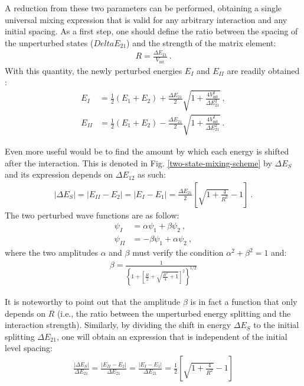 A reduction from these two parameters can be performed, obtaining a single universal mixing expression that is valid for any arbitrary interaction and any initial spacing. As a first step, one should define the ratio between the spacing of the unperturbed states ($Delta E_{21}$) and the strength of the matrix element:
\begin{align}
    R=\frac{\Delta E_{21}}{V_\text{int}}\ .
\end{align}
With this quantity, the newly perturbed energies $E_I$ and $E_{II}$ are readily obtained \cite{casten2000nuclear}:
\begin{align}
    E_I&=\frac{1}{2}(E_1+E_2)+\frac{\Delta E_{21}}{2}\sqrt{1+\frac{4V_\text{int}^2}{\Delta E_{21}^2}}\ ,\\
    E_{II}&=\frac{1}{2}(E_1+E_2)-\frac{\Delta E_{21}}{2}\sqrt{1+\frac{4V_\text{int}^2}{\Delta E_{21}^2}}\ .
    \label{eq-two-state-mixing-energies}
\end{align}

Even more useful would be to find the amount by which each energy is shifted after the interaction. This is denoted in Fig. \ref{two-state-mixing-scheme} by $\Delta E_S$ and its expression depends on $\Delta E_{12}$ as such:
\begin{align}
    |\Delta E_S|=|E_{II}-E_2|=|E_{I}-E_1|=\frac{\Delta E_{21}}{2}\left[\sqrt{1+\frac{4}{R^2}}-1\right]\ .
    \label{eq-shift-mixed-states}
\end{align}
The two perturbed wave functions are as follow:
\begin{align}
    \psi_I&=\alpha\psi_1+\beta\psi_2\ ,\nonumber\\
    \psi_{II}&=-\beta\psi_1+\alpha\psi_2\ ,
\end{align}
where the two amplitudes $\alpha$ and $\beta$ must verify the condition $\alpha^2+\beta^2=1$ and:
\begin{align}
    \beta=\frac{1}{\left\{1+\left[\frac{R}{2}+\sqrt{\frac{R^2}{4}+1}\right]^2\right\}^{1/2}}
    \label{eq-beta-mixing-amplitude}
\end{align}

It is noteworthy to point out that the amplitude $\beta$ is in fact a function that only depends on $R$ (i.e., the ratio between the unperturbed energy splitting and the interaction strength). Similarly, by dividing the shift in energy $\Delta E_S$ to the initial splitting $\Delta E_{21}$, one will obtain an expression that is independent of the initial level spacing:
\begin{align}
    \frac{|\Delta E_S|}{\Delta E_{21}}=\frac{|E_{II}-E_{2}|}{\Delta E_{21}}=\frac{|E_{I}-E_{1}|}{\Delta E_{21}}=\frac{1}{2}\left[\sqrt{1+\frac{4}{R^2}}-1\right]
\end{align}

